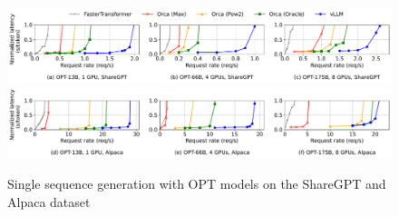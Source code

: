 \begin{figure}[t]
    \centering
    \includegraphics[scale=0.46]{figures/experiments/n1-sharegpt.pdf}
    \includegraphics[scale=0.46]{figures/experiments/n1-alpaca.pdf}
\vspace{-8pt}
\caption{Single sequence generation with OPT models on the ShareGPT and Alpaca dataset}
\vspace{-10pt}
\label{fig:single-sequence}
\end{figure}

